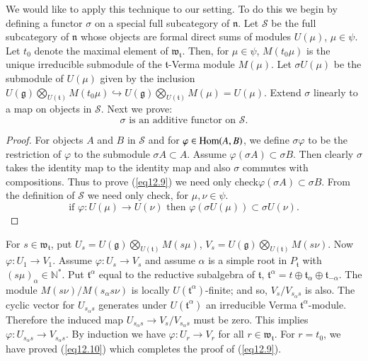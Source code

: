 We would like to apply this technique to our setting. To do this we
begin by defining a functor $\sigma$ on a special full subcategory of
$\mathfrak{n}$. Let $\mathscr{S}$ be the full subcategory of
$\mathfrak{n}$ whose objects are formal direct sums of modules
$U(\mu)$, $\mu \in \psi$. Let $t_0$ denote the maximal element of
$\mathfrak{w}_\mathfrak{t}$. Then, for $\mu \in \psi$, $M(t_0 \mu)$ is
the unique irreducible submodule of the $\mathfrak{t}$-Verma module
$M(\mu)$. Let $\sigma U(\mu)$ be the submodule of $U(\mu)$ given by
the inclusion $U(\mathfrak{g}) \bigotimes\limits_{U(\mathfrak{t})}
M(t_0 \mu) \hookrightarrow U(\mathfrak{g})
\bigotimes\limits_{U(\mathfrak{t})} M(\mu) = U(\mu)$. Extend $\sigma$
linearly to a map on objects in $\mathscr{S}$. Next we prove:
\begin{equation*}
\sigma \text{ is an additive functor on }\mathscr{S}. 
 \tag{12.9}\label{eq12.9}
\end{equation*}

\begin{proof}
For objects $A$  and $B$ in $\mathscr{S}$ and for $\varphi \in \operatorname{Hom}
(A,B)$, we define $\sigma \varphi$ to be the restriction of $\varphi$
to the  submodule $\sigma A \subset A$. Assume $\varphi(\sigma A)
\subset \sigma B$. Then clearly $\sigma$ takes the identity map to the
identity map and also $\sigma$ commutes with compositions. Thus to
prove (\ref{eq12.9}) we need only check\pageoriginale $\varphi (\sigma A)
\subset \sigma B$. From the definition of $\mathscr{S}$ we need only
check, for $\mu, \nu \in \psi$. 
\begin{equation*}
\text{if } \varphi : U(\mu) \to U(\nu) \text{ then } \varphi (\sigma
U(\mu)) \subset \sigma U(\nu). \tag{12.10} \label{eq12.10}
\end{equation*}
\end{proof}

For $s \in \mathfrak{w}_\mathfrak{t}$, put $U_s = U(\mathfrak{g})
\bigotimes\limits_{U(\mathfrak{t})} M(s\mu)$, $V_s = U(\mathfrak{g})
\bigotimes\limits_{U(\mathfrak{t})} M(s\nu)$. Now $\varphi:U_1 \to
V_1$. Assume $\varphi:U_s \to V_s$ and assume $\alpha$ is a simple
root in $P_\mathfrak{t}$ with $(s\mu)_\alpha \in \mathbb{N}^*$. Put
$\mathfrak{t}^\alpha$ equal to the reductive subalgebra of
$\mathfrak{t}$, $\mathfrak{t}^\alpha = t \oplus \mathfrak{t}_\alpha
\oplus \mathfrak{t}_{-\alpha}$. The module $M(s\nu)/M(s_\alpha s \nu)$
is locally $U(\mathfrak{t}^\alpha)$-finite; and so, $V_s/V_{s_\alpha
  s}$ is also. The cyclic vector for $U_{s_\alpha s}$ generates under
$U(\mathfrak{t}^\alpha)$ an irreducible Verma
$\mathfrak{t}^\alpha$-module. Therefore the induced map $U_{s_\alpha
  s} \to V_s/V_{s_\alpha s}$ must be zero. This implies $\varphi:
U_{s_\alpha s} \to V_{s_\alpha s}$. By induction we have $\varphi: U_r
\to V_r$ for all $r \in \mathfrak{w}_\mathfrak{t}$. For $r = t_0$, we
have proved (\ref{eq12.10}) which completes the proof of (\ref{eq12.9}).


